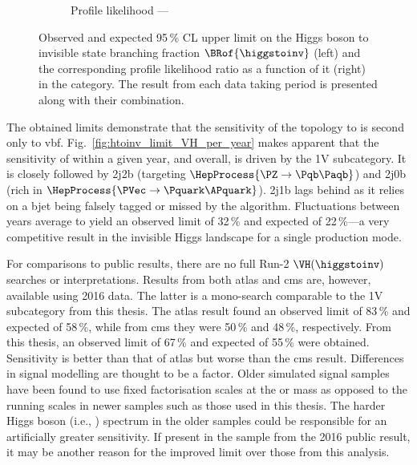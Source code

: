 \begin{figure}[htbp]
\begin{subfigure}[t]{0.45\textwidth}
        \caption{Profile likelihood --- \VH}
    \end{subfigure}
    \caption[Observed and expected 95\,\% CL upper limit on the Higgs boson to invisible state branching fraction $\BRof{\higgstoinv}$ (left) and the corresponding profile likelihood ratio as a function of it (right) in the \VH category]{Observed and expected 95\,\% CL upper limit on the Higgs boson to invisible state branching fraction $\BRof{\higgstoinv}$ (left) and the corresponding profile likelihood ratio as a function of it (right) in the \VH category. The result from each data taking period is presented along with their combination.}
    \label{fig:htoinv_limit_VH}
\end{figure}

The obtained limits demonstrate that the sensitivity of the \VH topology to \higgstoinv is second only to \acrshort{vbf}. Fig.~\ref{fig:htoinv_limit_VH_per_year} makes apparent that the sensitivity of \VH within a given year, and overall, is driven by the 1V subcategory. It is closely followed by 2j2b (targeting $\HepProcess{\PZ \to \Pqb\Paqb}$) and 2j0b (rich in $\HepProcess{\PVec \to \Pquark\APquark}$). 2j1b lags behind as it relies on a \gls{bjet} being falsely tagged or missed by the \deepcsv algorithm. Fluctuations between years average to yield an observed limit of 32\,\% and expected of 22\,\%---a very competitive result in the invisible Higgs landscape for a single production mode.

For comparisons to public results, there are no full Run-2 $\VH(\higgstoinv)$ searches or interpretations. Results from both \acrshort{atlas} and \acrshort{cms} are, however, available using 2016 data. The latter is a mono-\PVec search comparable to the 1V subcategory from this thesis. The \acrshort{atlas} \VH result found an observed limit of 83\,\% and expected of 58\,\%, while from \acrshort{cms} they were 50\,\% and 48\,\%, respectively. From this thesis, an observed limit of 67\,\% and expected of 55\,\% were obtained. Sensitivity is better than that of \acrshort{atlas} but worse than the \acrshort{cms} result. Differences in signal modelling are thought to be a factor. Older simulated signal samples have been found to use fixed factorisation scales at the \PW or \PH mass as opposed to the running scales in newer samples such as those used in this thesis. The harder Higgs boson \pt (i.e., \ptmiss) spectrum in the older samples could be responsible for an artificially greater sensitivity. If present in the \ttH sample from the 2016 public result, it may be another reason for the improved limit over those from this analysis.

